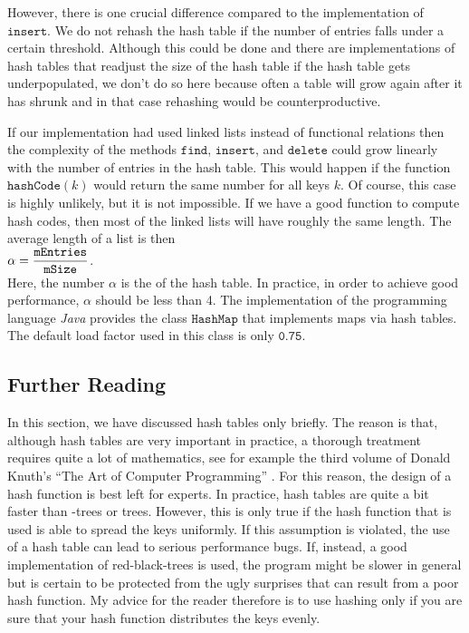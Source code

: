 However, there is one crucial difference compared to the implementation of $\texttt{insert}$.
We do not rehash the hash table if the number of entries falls under a certain threshold.
Although this could be done and there are implementations of hash tables that readjust the size of the
hash table if the hash table gets underpopulated, we don't do so here because often a table will
grow again after it has shrunk and in that case rehashing would be counterproductive.

If our implementation had used linked lists instead of functional relations then the complexity of
the methods  $\texttt{find}$, $\texttt{insert}$, and $\texttt{delete}$ could grow linearly with the number
of entries in the hash table.  This would happen if the function 
$\texttt{hashCode}(k)$ would return the same number for all keys $k$.  Of course, this case is
highly unlikely, but it is not impossible.  If we have a good function to compute hash codes, then
most of the linked lists will have roughly the same length.  The average length of a list is then
 \\[0.2cm]
\hspace*{1.3cm}
 $\alpha = \displaystyle \frac{\texttt{mEntries}}{\texttt{mSize}}$. 
\\[0.2cm]
Here, the number $\alpha$ is the  of the hash table.  In practice, in order to
achieve good performance, $\alpha$ should be less than 4.  The implementation of the programming
language \textsl{Java} provides the class  $\texttt{HashMap}$ that implements maps via hash tables.
The default load factor used in this class is only $\texttt{0.75}$.
\pagebreak

\subsection{Further Reading}
In this section, we have discussed hash tables only briefly.  The reason is that, although hash tables are very
important in practice, a thorough treatment requires quite a lot of mathematics, see for example the
third volume of Donald Knuth's ``The Art of Computer Programming'' \cite{knuth:1998b}.  For this
reason, the design of a hash function is best left for experts.  In practice, hash tables are
quite a bit faster than -trees or  trees.  However, this is only true if
the hash function that is used is able to spread the keys uniformly.  If this assumption is
violated, the use of a hash table can lead to serious performance 
bugs.  If, instead, a good
implementation of red-black-trees is used, the program might be slower in general but is certain to
be protected from the ugly surprises that can result from a poor hash function.  My advice for the reader
therefore is to use hashing only if you are sure that your hash function distributes the keys evenly.


